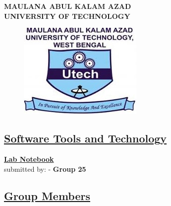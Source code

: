 \documentclass{article}
\begin{document}

\begin{center}
    \huge\textbf{MAULANA ABUL KALAM AZAD \\ \vspace{0.5cm}UNIVERSITY OF TECHNOLOGY}\\
    \vspace{0.5 cm}{MAKAUT WB}

\end{center}
\begin{figure}[h!]
    \centering
    \includegraphics[width=0.3\linewidth]{MAKAUT_LOGO.jpg}
\end{figure}
\date{\today} 
\begin{center}
    \section*{\textbf{\underline{Software Tools and Technology}}}
    \textbf{\underline{Lab Notebook}} \\
    \LARGE submitted by: - \textbf{Group 25}
\end{center}
\begin{center}
\section*{\textbf{\underline{Group Members}}}
\end{center}
\vspace{0.2 cm}
\end{document}
